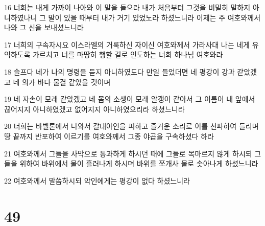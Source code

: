 \par 16 너희는 내게 가까이 나아와 이 말을 들으라 내가 처음부터 그것을 비밀히 말하지 아니하였나니 그 말이 있을 때부터 내가 거기 있었노라 하셨느니라 이제는 주 여호와께서 나와 그 신을 보내셨느니라
\par 17 너희의 구속자시요 이스라엘의 거룩하신 자이신 여호와께서 가라사대 나는 네게 유익하도록 가르치고 너를 마땅히 행할 길로 인도하는 너희 하나님 여호와라
\par 18 슬프다 네가 나의 명령을 듣지 아니하였도다 만일 들었더면 네 평강이 강과 같았겠고 네 의가 바다 물결 같았을 것이며
\par 19 네 자손이 모래 같았겠고 네 몸의 소생이 모래 알갱이 같아서 그 이름이 내 앞에서 끊어지지 아니하였겠고 없어지지 아니하였으리라 하셨느니라
\par 20 너희는 바벨론에서 나와서 갈대아인을 피하고 즐거운 소리로 이를 선파하여 들리며 땅 끝까지 반포하여 이르기를 여호와께서 그종 야곱을 구속하셨다 하라
\par 21 여호와께서 그들을 사막으로 통과하게 하시던 때에 그들로 목마르지 않게 하시되 그들을 위하여 바위에서 물이 흘러나게 하시며 바위를 쪼개사 물로 솟아나게 하셨느니라
\par 22 여호와께서 말씀하시되 악인에게는 평강이 없다 하셨느니라

\chapter{49}

